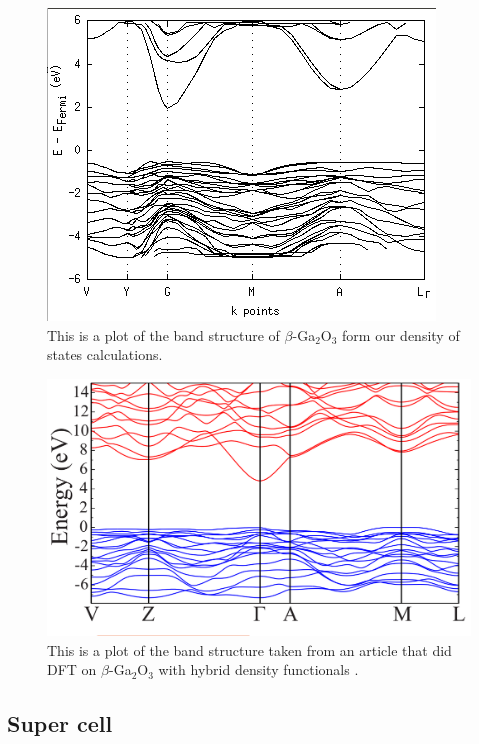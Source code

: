\begin{figure}[H]\caption{This is a plot of the band structure of $\beta$-Ga$_2$O$_3$ form our density of states calculations.}\label{fig:bandstructure_primitive}
\includegraphics[width=\linewidth]{../fig/primitive/bandstructure}
\end{figure}


\begin{figure}[H]\caption{This is a plot of the band structure taken from an article that did DFT on $\beta$-Ga$_2$O$_3$ with hybrid density functionals \cite{dft_ga2o3}.}\label{fig:bandstructure_fasit}
\includegraphics[width=\linewidth]{../fig/band_structure}
\end{figure}


\subsection{Super cell}

